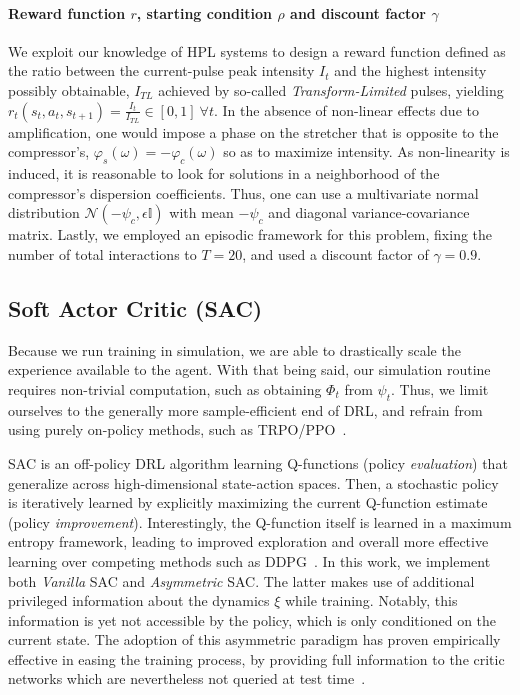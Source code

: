 \paragraph{Reward function \( r \), starting condition \( \rho \) and discount factor \( \gamma \)}
We exploit our knowledge of HPL systems to design a reward function defined as the ratio between the current-pulse peak intensity \( I_t \) and the highest intensity possibly obtainable, \( I_{TL} \) achieved by so-called \emph{Transform-Limited} pulses, yielding \(r_t(s_t, a_t, s_{t+1}) = \frac{I_t}{I_{TL}} \in [0,1] \ \forall t \). In the absence of non-linear effects due to amplification, one would impose a phase on the stretcher that is opposite to the compressor's, \( \varphi_s(\omega) = - \varphi_c(\omega) \) so as to maximize intensity. As non-linearity is induced, it is reasonable to look for solutions in a neighborhood of the compressor's dispersion coefficients. Thus, one can use a multivariate normal distribution \( \mathcal N(-\psi_c, \epsilon \mathbb I) \) with mean \( -\psi_c \) and diagonal variance-covariance matrix. Lastly, we employed an episodic framework for this problem, fixing the number of total interactions to \( T=20 \), and used a discount factor of \( \gamma=0.9 \).

\subsection{Soft Actor Critic (SAC)}
Because we run training in simulation, we are able to drastically scale the experience available to the agent. With that being said, our simulation routine requires non-trivial computation, such as obtaining \( \Phi_t \) from \( \psi_t \). Thus, we limit ourselves to the generally more sample-efficient end of DRL, and refrain from using purely on-policy methods, such as TRPO/PPO~\citep{schulman2015trust, schulman2017proximal}.

SAC is an off-policy DRL algorithm learning Q-functions (policy \textit{evaluation}) that generalize across high-dimensional state-action spaces. Then, a stochastic policy is iteratively learned by explicitly maximizing the current Q-function estimate (policy \textit{improvement}). 
Interestingly, the Q-function itself is learned in a maximum entropy framework, leading to improved exploration and overall more effective learning over competing methods such as DDPG~\citep{haarnoja2018soft}. In this work, we implement both \emph{Vanilla} SAC and \emph{Asymmetric} SAC. The latter makes use of additional privileged information about the dynamics \( \xi \) while training. Notably, this information is yet not accessible by the policy, which is only conditioned on the current state.
The adoption of this asymmetric paradigm has proven empirically effective in easing the training process, by providing full information to the critic networks which are nevertheless not queried at test time~\citep{akkaya2019solving}.

